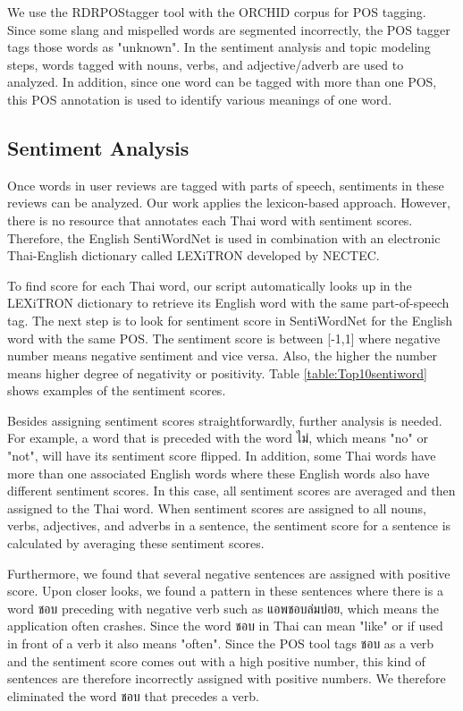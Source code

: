 We use the RDRPOStagger tool\cite{RDRPOSTagger} with the ORCHID corpus\cite{ORCHID} for POS tagging. Since some slang and mispelled words are segmented incorrectly, the POS tagger tags those words as "unknown". In the sentiment analysis and topic modeling steps, words tagged with nouns, verbs, and adjective/adverb are used to analyzed. In addition, since one word can be tagged with more than one POS, this POS annotation is used to identify various meanings of one word.

\subsection{Sentiment Analysis}
Once words in user reviews are tagged with parts of speech, sentiments in these reviews can be analyzed. Our work applies the lexicon-based approach. However, there is no resource that annotates each Thai word with sentiment scores. Therefore, the English SentiWordNet \cite{SentiWordNet} is used in combination with an electronic Thai-English dictionary called LEXiTRON \cite{LEXiTRON} developed by NECTEC.

To find score for each Thai word, our script automatically looks up in the LEXiTRON dictionary to retrieve its English word with the same part-of-speech tag. The next step is to look for sentiment score in SentiWordNet for the English word with the same POS. The sentiment score is between [-1,1] where negative number means negative sentiment and vice versa. Also, the higher the number means higher degree of negativity or positivity. Table \ref{table:Top10sentiword} shows examples of the sentiment scores. 

Besides assigning sentiment scores straightforwardly, further analysis is needed. For example, 
a word that is preceded with the word {ไม่}, which means "no" or "not", will have its sentiment score flipped. In addition, some Thai words have more than one associated English words where these English words also have different sentiment scores. In this case, all sentiment scores are  averaged and then assigned to the Thai word. When sentiment scores are assigned to all nouns, verbs, adjectives, and adverbs in a sentence, the sentiment score for a sentence is calculated by averaging these sentiment scores.

Furthermore, we found that several negative sentences are assigned with positive score. Upon closer looks, we found a pattern in these sentences where there is a word {ชอบ} preceding with negative verb such as {แอพชอบล่มบ่อย}, which means the application often crashes. Since the word {ชอบ} in Thai can mean "like" or if used in front of a verb it also means "often". Since the POS tool tags {ชอบ} as a verb and the sentiment score comes out with a high positive number, this kind of sentences are therefore incorrectly assigned with positive numbers. We therefore eliminated the word {ชอบ} that precedes a verb.


